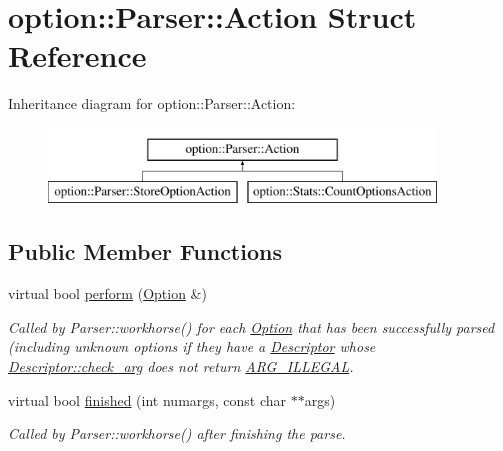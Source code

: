 \hypertarget{structoption_1_1_parser_1_1_action}{}\section{option\+:\+:Parser\+:\+:Action Struct Reference}
\label{structoption_1_1_parser_1_1_action}
Inheritance diagram for option\+:\+:Parser\+:\+:Action\+:\begin{figure}[H]
\begin{center}
\leavevmode
\includegraphics[height=2.000000cm]{structoption_1_1_parser_1_1_action}
\end{center}
\end{figure}
\subsection*{Public Member Functions}
\begin{DoxyCompactItemize}
\item 
virtual bool \hyperlink{structoption_1_1_parser_1_1_action_a176b5f783bb35eb015b6d2c09422457d}{perform} (\hyperlink{classoption_1_1_option}{Option} \&)
\begin{DoxyCompactList}\small\item\em Called by Parser\+::workhorse() for each \hyperlink{classoption_1_1_option}{Option} that has been successfully parsed (including unknown options if they have a \hyperlink{structoption_1_1_descriptor}{Descriptor} whose \hyperlink{structoption_1_1_descriptor_aa5d675dba0214a4abd73007ff163cc67}{Descriptor\+::check\+\_\+arg} does not return \hyperlink{namespaceoption_aee8c76a07877335762631491e7a5a1a9a9528e32563b795bd2930b12d0a5e382d}{A\+R\+G\+\_\+\+I\+L\+L\+E\+G\+AL}. \end{DoxyCompactList}\item 
virtual bool \hyperlink{structoption_1_1_parser_1_1_action_a3ec558b51e34d33d116f14587289e032}{finished} (int numargs, const char $\ast$$\ast$args)
\begin{DoxyCompactList}\small\item\em Called by Parser\+::workhorse() after finishing the parse. \end{DoxyCompactList}\end{DoxyCompactItemize}


